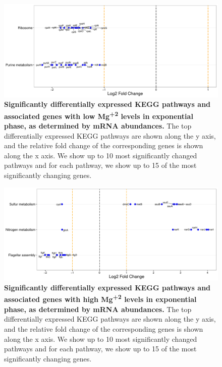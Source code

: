 \documentclass[a4paper]{article}
\begin{document}
\clearpage
\begin{figure}
	\includegraphics[width=1.0\textwidth]{../../d_figures/kegg_09.pdf}
	\caption[Significantly altered KEGG pathways for mRNA samples in exponential phase tested for low Mg\textsuperscript{+2} levels against base Mg\textsuperscript{+2}]
	{\textbf{Significantly differentially expressed KEGG pathways and associated genes with low Mg\textsuperscript{+2} levels in exponential phase, as determined by mRNA abundances.} The top differentially expressed KEGG pathways are shown along the y axis, and the relative fold change of the corresponding genes is shown along the x axis. We show up to 10 most significantly changed pathways and for each pathway, we show up to 15 of the most significantly changing genes.}
\end{figure}

\clearpage
\begin{figure}
	\includegraphics[width=1.0\textwidth]{../../d_figures/kegg_10.pdf}
	\caption[Significantly altered KEGG pathways for mRNA samples in exponential phase tested for high Mg\textsuperscript{+2} against base Mg\textsuperscript{+2}]
	{\textbf{Significantly differentially expressed KEGG pathways and associated genes with high Mg\textsuperscript{+2} levels in exponential phase, as determined by mRNA abundances.} The top differentially expressed KEGG pathways are shown along the y axis, and the relative fold change of the corresponding genes is shown along the x axis. We show up to 10 most significantly changed pathways and for each pathway, we show up to 15 of the most significantly changing genes.}
\end{figure}
\end{document}
